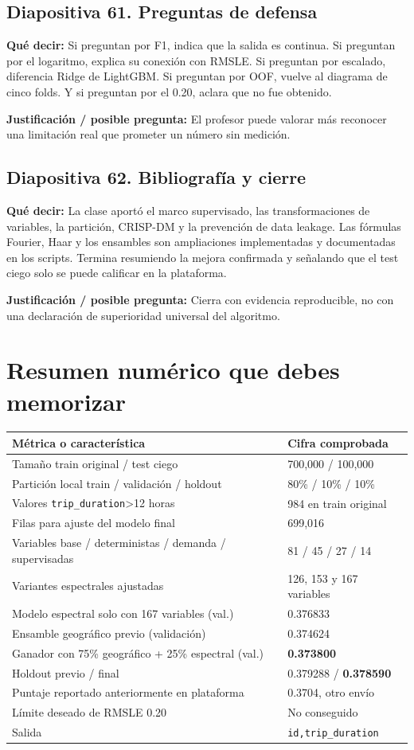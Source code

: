 \documentclass[11pt,letterpaper]{article}
\newcommand{\lamina}[2]{\subsection*{Diapositiva #1. #2}}
\newcommand{\explica}[1]{\noindent\textcolor{azul}{\textbf{Qué decir:}} #1\par\smallskip}
\newcommand{\defiende}[1]{\noindent\textcolor{verde}{\textbf{Justificación / posible pregunta:}} #1\par\medskip}
\begin{document}
\lamina{61}{Preguntas de defensa}
\explica{Si preguntan por F1, indica que la salida es continua. Si preguntan por el logaritmo, explica su conexión con RMSLE. Si preguntan por escalado, diferencia Ridge de LightGBM. Si preguntan por OOF, vuelve al diagrama de cinco folds. Y si preguntan por el 0.20, aclara que no fue obtenido.}
\defiende{El profesor puede valorar más reconocer una limitación real que prometer un número sin medición.}

\lamina{62}{Bibliografía y cierre}
\explica{La clase aportó el marco supervisado, las transformaciones de variables, la partición, CRISP-DM y la prevención de data leakage. Las fórmulas Fourier, Haar y los ensambles son ampliaciones implementadas y documentadas en los scripts. Termina resumiendo la mejora confirmada y señalando que el test ciego solo se puede calificar en la plataforma.}
\defiende{Cierra con evidencia reproducible, no con una declaración de superioridad universal del algoritmo.}


\section*{Resumen numérico que debes memorizar}
\begin{center}\small
\begin{tabular}{p{.60\linewidth}p{.30\linewidth}}
\toprule
Métrica o característica & Cifra comprobada\\
\midrule
Tamaño train original / test ciego & 700,000 / 100,000\\
Partición local train / validación / holdout & 80\% / 10\% / 10\%\\
Valores \texttt{trip\_duration}>12 horas & 984 en train original\\
Filas para ajuste del modelo final & 699,016\\
Variables base / deterministas / demanda / supervisadas & 81 / 45 / 27 / 14\\
Variantes espectrales ajustadas & 126, 153 y 167 variables\\
Modelo espectral solo con 167 variables (val.) & 0.376833\\
Ensamble geográfico previo (validación) & 0.374624\\
Ganador con 75\% geográfico + 25\% espectral (val.) & \textbf{0.373800}\\
Holdout previo / final & 0.379288 / \textbf{0.378590}\\
Puntaje reportado anteriormente en plataforma & 0.3704, otro envío\\
Límite deseado de RMSLE 0.20 & No conseguido\\
Salida & \texttt{id,trip\_duration}\\
\bottomrule
\end{tabular}
\end{center}
\end{document}
